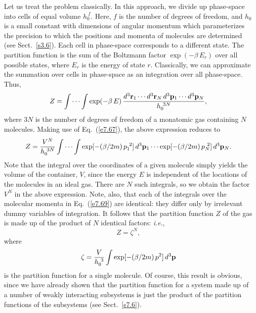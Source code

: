 Let us treat the problem classically. In this approach, we divide up phase-space
into cells of equal volume $h_0^{~f}$. Here, $f$ is the number of degrees of
freedom, and $h_0$ is a small constant with dimensions of angular momentum which
parameterizes the precision to which the positions and momenta of molecules
are determined (see Sect.~\ref{s3.6}). 
Each cell in phase-space corresponds to a different state.
The partition function is the sum of the Boltzmann factor $\exp(-\beta \,E_r)$
over all possible states, where $E_r$ is the energy of state $r$. 
Classically, we can approximate the summation over cells in phase-space
as an integration over all phase-space. Thus,
\begin{equation}
Z = \int\cdots \int \exp(-\beta \, E)\, \frac{d^3{\bf r}_1\cdots d^3{\bf r}_N\,
d^3{\bf p}_1\cdots d^3{\bf p}_N}{h_0^{~3N}},
\end{equation}
where $3N$ is the number of degrees of freedom of a monatomic gas containing
$N$ molecules. Making use of Eq.~(\ref{e7.67}),
 the above 
expression reduces to
\begin{equation}
Z = \frac{V^N}{h_0^{~3N}}\int\cdots \int \exp[-(\beta/2m)\,p_1^{~2}]\,d^3{\bf p}_1
\cdots \exp[-(\beta/2m)\,p_N^{~2}]\,d^3{\bf p}_N.\label{e7.69}
\end{equation}
Note that the  integral over the coordinates of a given
molecule simply yields the volume
of the container, $V$, since the energy $E$ is independent of the 
locations of the molecules
 in an ideal gas. There are $N$ such integrals, so we obtain the factor
$V^N$ in the above expression. Note, also, that 
 each of the integrals over the molecular momenta in Eq.~(\ref{e7.69})
are identical: they differ only by irrelevant dummy variables of integration. 
It follows that the partition function $Z$ of the gas  is made up of the product of
$N$ identical factors: {\em i.e.}, 
\begin{equation}
Z = \zeta^N,
\end{equation}
where 
\begin{equation}
\zeta = \frac{V}{h_0^{~3}}\int \exp[-(\beta/2m)\,p^2]\,d^3{\bf p}\label{e7.71}
\end{equation}
is the partition function for a single molecule. Of course, this
result is obvious, since we have already shown that the partition function for
a system made up of a number of weakly interacting subsystems is just the
product of the partition functions of the subsystems (see Sect.~\ref{s7.6}).

